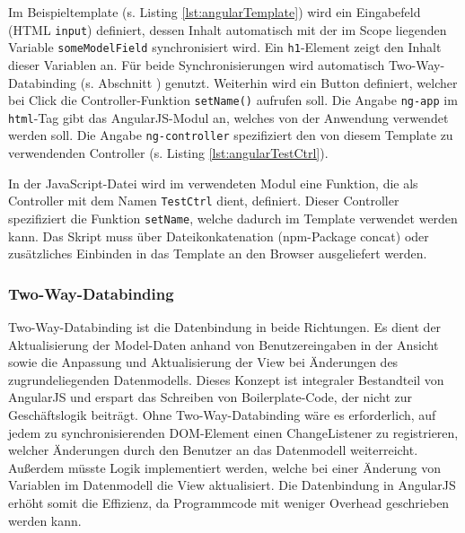 \begin{figure}[H]

\end{figure}

Im Beispieltemplate (s. Listing \ref{lst:angularTemplate}) wird ein Eingabefeld (HTML \texttt{input}) definiert, dessen Inhalt automatisch mit der im Scope liegenden Variable \texttt{someModelField} synchronisiert wird. Ein \texttt{h1}-Element zeigt den Inhalt dieser Variablen an. Für beide Synchronisierungen wird automatisch Two-Way-Databinding (s. Abschnitt ) genutzt. Weiterhin wird ein Button definiert, welcher bei Click die Controller-Funktion \texttt{setName()} aufrufen soll. Die Angabe \texttt{ng-app} im \texttt{html}-Tag gibt das AngularJS-Modul an, welches von der Anwendung verwendet werden soll. Die Angabe \texttt{ng-controller} spezifiziert den von diesem Template zu verwendenden Controller (s. Listing \ref{lst:angularTestCtrl}).

\begin{figure}[H]
	
\end{figure}

In der JavaScript-Datei wird im verwendeten Modul eine Funktion, die als Controller mit dem Namen \texttt{TestCtrl} dient, definiert. Dieser Controller spezifiziert die Funktion \texttt{setName}, welche dadurch im Template verwendet werden kann. Das Skript muss über Dateikonkatenation (npm-Package \glqq concat\grqq \cite{npm-concat}) oder zusätzliches Einbinden in das Template an den Browser ausgeliefert werden.

\subsubsection{Two-Way-Databinding}
\label{sec:twoWayDatabinding}
Two-Way-Databinding ist die Datenbindung in beide Richtungen. Es dient der Aktualisierung der Model-Daten anhand von Benutzereingaben in der Ansicht sowie die Anpassung und Aktualisierung der View bei Änderungen des zugrundeliegenden Datenmodells. Dieses Konzept ist integraler Bestandteil von AngularJS und erspart das Schreiben von Boilerplate-Code, der nicht zur Geschäftslogik beiträgt. Ohne Two-Way-Databinding wäre es erforderlich, auf jedem zu synchronisierenden DOM-Element einen ChangeListener zu registrieren, welcher Änderungen durch den Benutzer an das Datenmodell weiterreicht. Außerdem müsste Logik implementiert werden, welche bei einer Änderung von Variablen im Datenmodell die View aktualisiert. Die Datenbindung in AngularJS erhöht somit die Effizienz, da Programmcode mit weniger Overhead geschrieben werden kann.\cite[][24]{angular-boehm}

